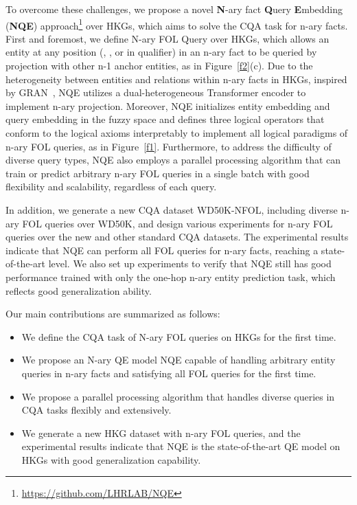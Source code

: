 \documentclass[letterpaper]{article} \usepackage{aaai23}  \usepackage{times}  \usepackage{helvet}  \usepackage{courier}  \usepackage[hyphens]{url}  \usepackage{graphicx} \urlstyle{rm} \def\UrlFont{\rm}  \usepackage{natbib}  \usepackage{caption} \frenchspacing  \setlength{\pdfpagewidth}{8.5in}  \setlength{\pdfpageheight}{11in}  \usepackage{algorithm}
\begin{document}
To overcome these challenges, we propose a novel \textbf{N}-ary fact \textbf{Q}uery \textbf{E}mbedding (\textbf{NQE}) approach\footnote{\url{https://github.com/LHRLAB/NQE}} over HKGs, which aims to solve the CQA task for n-ary facts. First and foremost, we define N-ary FOL Query over HKGs, which allows an entity at any position (, , or  in qualifier) in an n-ary fact to be queried by projection with other n-1 anchor entities, as in Figure~\ref{f2}(c). Due to the heterogeneity between entities and relations within n-ary facts in HKGs, inspired by GRAN~\citep{HAN,RPRT,GRAN}, NQE utilizes a dual-heterogeneous Transformer encoder to implement n-ary projection. Moreover, NQE initializes entity embedding and query embedding in the fuzzy space and defines three logical operators that conform to the logical axioms interpretably to implement all logical paradigms of n-ary FOL queries, as in Figure~\ref{f1}. Furthermore, to address the difficulty of diverse query types, NQE also employs a parallel processing algorithm that can train or predict arbitrary n-ary FOL queries in a single batch with good flexibility and scalability, regardless of each query.

In addition, we generate a new CQA dataset WD50K-NFOL, including diverse n-ary FOL queries over WD50K, and design various experiments for n-ary FOL queries over the new and other standard CQA datasets. The experimental results indicate that NQE can perform all FOL queries for n-ary facts, reaching a state-of-the-art level. We also set up experiments to verify that NQE still has good performance trained with only the one-hop n-ary entity prediction task, which reflects good generalization ability. 

Our main contributions are summarized as follows:

\begin{itemize}
\item We define the CQA task of N-ary FOL queries on HKGs for the first time.
\item We propose an N-ary QE model NQE capable of handling arbitrary entity queries in n-ary facts and satisfying all FOL queries for the first time. 
\item We propose a parallel processing algorithm that handles diverse queries in CQA tasks flexibly and extensively.
\item We generate a new HKG dataset with n-ary FOL queries, and the experimental results indicate that NQE is the state-of-the-art QE model on HKGs with good generalization capability.
\end{itemize}
\end{document}
